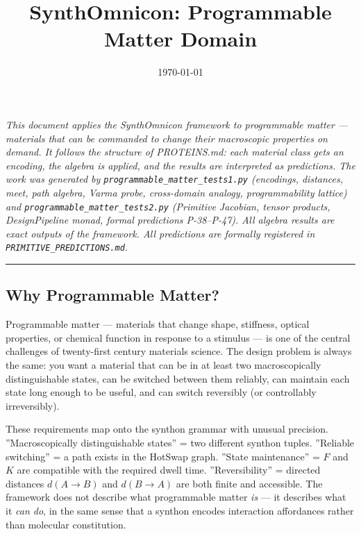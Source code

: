 \documentclass[12pt,a4paper]{article}
\begin{document}
\title{SynthOmnicon: Programmable Matter Domain}
\date{\today}

\maketitle

\emph{This document applies the SynthOmnicon framework to programmable matter --- materials that can be commanded to change their macroscopic properties on demand. It follows the structure of PROTEINS.md: each material class gets an encoding, the algebra is applied, and the results are interpreted as predictions. The work was generated by \texttt{programmable\_matter\_tests1.py} (encodings, distances, meet, path algebra, Varma probe, cross-domain analogy, programmability lattice) and \texttt{programmable\_matter\_tests2.py} (Primitive Jacobian, tensor products, DesignPipeline monad, formal predictions P-38--P-47). All algebra results are exact outputs of the framework. All predictions are formally registered in \texttt{PRIMITIVE\_PREDICTIONS.md}.}

\begin{center}
\rule{0.5\textwidth}{0.4pt}
\end{center}

\subsection{Why Programmable Matter?}

Programmable matter --- materials that change shape, stiffness, optical properties, or chemical function in response to a stimulus --- is one of the central challenges of twenty-first century materials science. The design problem is always the same: you want a material that can be in at least two macroscopically distinguishable states, can be switched between them reliably, can maintain each state long enough to be useful, and can switch reversibly (or controllably irreversibly).

These requirements map onto the synthon grammar with unusual precision. ''Macroscopically distinguishable states'' = two different synthon tuples. ''Reliable switching'' = a path exists in the HotSwap graph. ''State maintenance'' = $F$ and $K$ are compatible with the required dwell time. ''Reversibility'' = directed distances $d(A \to B)$ and $d(B \to A)$ are both finite and accessible. The framework does not describe what programmable matter \emph{is} --- it describes what it \emph{can do}, in the same sense that a synthon encodes interaction affordances rather than molecular constitution.
\end{document}
